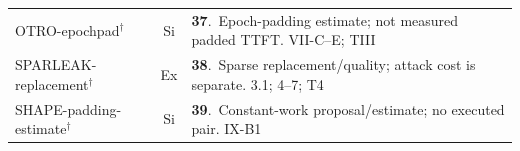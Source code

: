 \begin{table}[p]
\begin{minipage}[t]{0.495\textwidth}
\begin{tabularx}{\linewidth}{@{}p{.36\linewidth}cY@{}}
\textsf{OTRO-epochpad}$^{\dagger}$~\cite{lee2026otro} & Si & \textbf{37}.~Epoch-padding estimate; not measured padded TTFT. VII-C--E; TIII\\
\textsf{SPARLEAK-replacement}$^{\dagger}$~\cite{chen2026sparleak} & Ex & \textbf{38}.~Sparse replacement/quality; attack cost is separate. 3.1; 4--7; T4\\
\textsf{SHAPE-padding-estimate}$^{\dagger}$~\cite{hadad2026shape} & Si & \textbf{39}.~Constant-work proposal/estimate; no executed pair. IX-B1\\
\bottomrule\end{tabularx}
\end{minipage}
\end{table}
